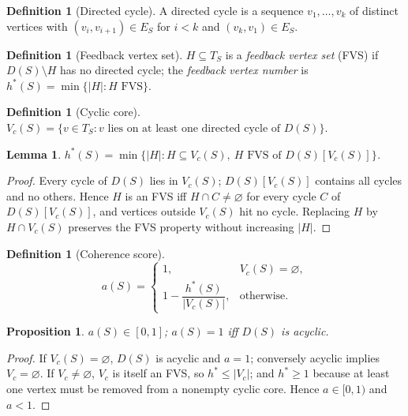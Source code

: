\documentclass[11pt]{article}
\newtheorem{lemma}[theorem]{Lemma}
\newtheorem{proposition}[theorem]{Proposition}
\theoremstyle{definition}
\newtheorem{definition}[theorem]{Definition}
\theoremstyle{remark}
\begin{document}
\begin{definition}[Directed cycle]
A directed cycle is a sequence $v_1,\dots,v_k$ of distinct vertices with $(v_i,v_{i+1})\in E_S$ for $i<k$ and $(v_k,v_1)\in E_S$.
\end{definition}

\begin{definition}[Feedback vertex set]\label{def:fvs}
$H\subseteq T_S$ is a \emph{feedback vertex set} (FVS) if $D(S)\setminus H$ has no directed cycle; the \emph{feedback vertex number} is $h^*(S)=\min\{|H|:H\text{ FVS}\}$.
\end{definition}

\begin{definition}[Cyclic core]\label{def:core}
$V_c(S)=\{v\in T_S: v \text{ lies on at least one directed cycle of } D(S)\}$.
\end{definition}

\begin{lemma}\label{lem:core}
$h^*(S)=\min\{|H|:H\subseteq V_c(S),\ H\text{ FVS of } D(S)[V_c(S)]\}$.
\end{lemma}

\begin{proof}
Every cycle of $D(S)$ lies in $V_c(S)$; $D(S)[V_c(S)]$ contains all cycles and no others. Hence $H$ is an FVS iff $H\cap C\ne\varnothing$ for every cycle $C$ of $D(S)[V_c(S)]$, and vertices outside $V_c(S)$ hit no cycle. Replacing $H$ by $H\cap V_c(S)$ preserves the FVS property without increasing $|H|$.
\end{proof}

\begin{definition}[Coherence score]\label{def:coh}
\[
a(S)=
\begin{cases}
1, & V_c(S)=\varnothing,\\[2mm]
1-\dfrac{h^*(S)}{|V_c(S)|}, & \text{otherwise.}
\end{cases}
\]
\end{definition}

\begin{proposition}\label{prop:range}
$a(S)\in[0,1]$; $a(S)=1$ iff $D(S)$ is acyclic.
\end{proposition}

\begin{proof}
If $V_c(S)=\varnothing$, $D(S)$ is acyclic and $a=1$; conversely acyclic implies $V_c=\varnothing$. If $V_c\ne\varnothing$, $V_c$ is itself an FVS, so $h^*\le|V_c|$; and $h^*\ge 1$ because at least one vertex must be removed from a nonempty cyclic core. Hence $a\in[0,1)$ and $a<1$.
\end{proof}
\end{document}
